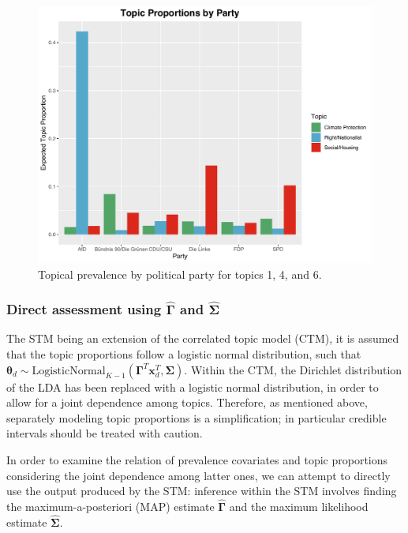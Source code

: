 \begin{figure}[h!]
  \centering
  \captionsetup{justification=centering,margin=2cm}
  \includegraphics[scale = 0.5]{../plots/5_1/quasi_t146_cat.pdf}
  \caption{Topical prevalence by political party for topics 1, 4, and 6.}
  \label{fig:quasi_t146_cat}
\end{figure}

\subsubsection{Direct assessment using $\hat{\boldsymbol{\Gamma}}$ and $\hat{\boldsymbol{\Sigma}}$}
\label{Direct assessment}

The STM being an extension of the correlated topic model (CTM), it is assumed that the topic proportions follow a logistic normal distribution, such that $\boldsymbol{\theta}_d \sim \text{LogisticNormal}_{K-1}(\boldsymbol{\Gamma}^T\boldsymbol{x}_d^T, \boldsymbol{\Sigma})$. Within the CTM, the Dirichlet distribution of the LDA has been replaced with a logistic normal distribution, in order to allow for a joint dependence among topics. Therefore, as mentioned above, separately modeling topic proportions is a simplification; in particular credible intervals should be treated with caution.

In order to examine the relation of prevalence covariates and topic proportions considering the joint dependence among latter ones, we can attempt to directly use the output produced by the STM: inference within the STM involves finding the maximum-a-posteriori (MAP) estimate $\hat{\boldsymbol{\Gamma}}$ and the maximum likelihood estimate $\hat{\boldsymbol{\Sigma}}$. 


